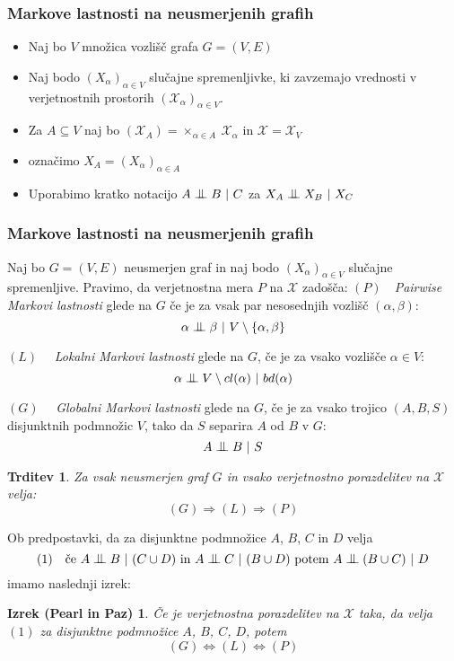\documentclass{beamer}
\newtheorem{trditev}[definicija]{Trditev}
\newtheorem{izrek_p_z}[izrek]{Izrek (Pearl in Paz)}
\newcommand{\cond}{\mathrel{\text{\scalebox{1.07}{$\perp\mkern-10mu\perp$}}}}
\begin{document}
\begin{frame}
    \frametitle{Markove lastnosti na neusmerjenih grafih}
    \begin{itemize}
        \item Naj bo $V$ množica vozlišč grafa $G=(V,E)$
        \item Naj bodo $(X_\alpha)_{\alpha \in V}$ slučajne spremenljivke, ki zavzemajo vrednosti
        v verjetnostnih prostorih $(\mathcal{X}_\alpha)_{\alpha \in V}$. 
        \item Za $A \subseteq V$ naj bo $(\mathcal{X}_A) = \times_{\alpha \in A} ~ \mathcal{X}_\alpha$ in $\mathcal{X} = \mathcal{X}_V$
        \item označimo $X_A = (X_\alpha)_{\alpha \in A}$ 
        \item Uporabimo kratko notacijo $A \cond B ~|~ C$ za $X_A \cond X_B ~|~ X_C$
    \end{itemize}
\end{frame}

\begin{frame}
    \frametitle{Markove lastnosti na neusmerjenih grafih}
    Naj bo $G = (V,E)$ neusmerjen graf in naj bodo $ (X_\alpha)_{\alpha \in V} $
    slučajne spremenljive. Pravimo, da verjetnostna mera $P$ na $\mathcal{X}$ zadošča: 
    \newline \newline
    $(P) \quad $\emph{Pairwise Markovi lastnosti} glede na $G$ če je za 
    vsak par nesosednjih vozlišč $(\alpha, \beta)$: 
    $$ \alpha \cond \beta ~|~ V \setminus \{\alpha, \beta\}   $$

    $(L) \quad $ \emph{Lokalni Markovi lastnosti} glede na $G$, če je za 
    vsako vozlišče $\alpha \in V$:
    $$ \alpha \cond V \setminus cl(\alpha) ~|~ bd(\alpha) $$ 

    $(G) \quad $ \emph{Globalni Markovi lastnosti} glede na $G$, če je za 
    vsako trojico $(A, B, S)$ disjunktnih podmnožic $V$, tako da $S$ 
    separira $A$ od $B$ v $G$:
    \[ A \cond B ~|~ S \] 

\end{frame}
\begin{frame}
    \begin{trditev}
        Za vsak neusmerjen graf $G$ in vsako verjetnostno porazdelitev na $\mathcal{X}$ velja:
        $$ (G) \Longrightarrow (L) \Longrightarrow (P) $$
    \end{trditev}
    Ob predpostavki, da za disjunktne podmnožice $A$, $B$, $C$ in $D$ velja
    $$(1) \quad \text{če} ~A \cond B ~|~ (C \cup D) ~\text{in}~ A \cond C ~|~ (B \cup D) ~ \text{potem} ~ A \cond (B \cup C) ~|~ D $$
    imamo naslednji izrek:
    \begin{izrek_p_z}
        Če je verjetnostna porazdelitev na $\mathcal{X} $ taka, da velja $(1)$ za disjunktne
        podmnožice $A$, $B$, $C$, $D$, potem 
        $$ (G) \Longleftrightarrow (L) \Longleftrightarrow (P)$$
    \end{izrek_p_z}
\end{frame}
\end{document}

